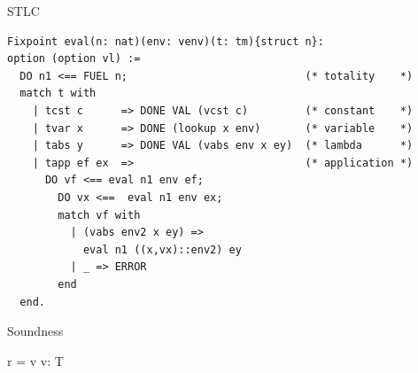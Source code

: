 \documentclass{beamer}
\begin{document}

\begin{frame}[fragile]{STLC}
\begin{lstlisting}[keywords={}]
Fixpoint eval(n: nat)(env: venv)(t: tm){struct n}: 
option (option vl) :=
  DO n1 <== FUEL n;                            (* totality    *)
  match t with
    | tcst c      => DONE VAL (vcst c)         (* constant    *)
    | tvar x      => DONE (lookup x env)       (* variable    *)
    | tabs y      => DONE VAL (vabs env x ey)  (* lambda      *)
    | tapp ef ex  =>                           (* application *)
      DO vf <== eval n1 env ef;
        DO vx <==  eval n1 env ex;
        match vf with
          | (vabs env2 x ey) =>
            eval n1 ((x,vx)::env2) ey
          | _ => ERROR
        end
  end.
\end{lstlisting}
\end{frame}


\begin{frame}[fragile]{Soundness}

{r =  v \gap v: T \gap}

\end{frame}
\end{document}
